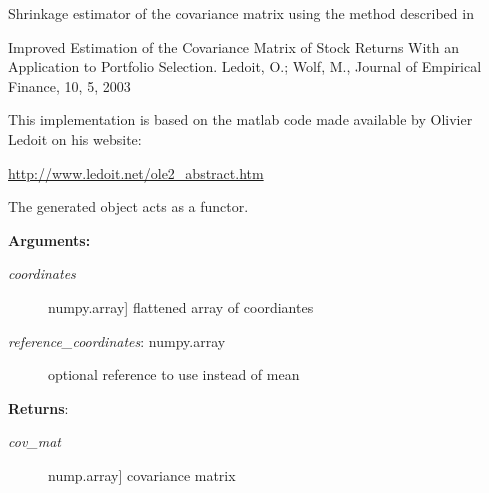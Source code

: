 \documentclass[letterpaper,10pt,english]{sphinxmanual}
\begin{document}
\begin{fulllineitems}
\label{index:encore.covariance.EstimatorShrinkage}
Shrinkage estimator of the covariance matrix using the method described in

Improved Estimation of the Covariance Matrix of Stock Returns With an Application 
to Portfolio Selection. Ledoit, O.; Wolf, M., Journal of Empirical Finance, 10, 5, 2003

This implementation is based on the matlab code made available by Olivier Ledoit on
his website:

\href{http://www.ledoit.net/ole2\_abstract.htm}{http://www.ledoit.net/ole2\_abstract.htm}

The generated object acts as a functor.

\begin{fulllineitems}
\label{index:encore.covariance.EstimatorShrinkage.calculate}
\textbf{Arguments:}
\begin{description}
\item[{\emph{coordinates}}] \leavevmode{[}numpy.array{]}
flattened array of coordiantes

\item[{\emph{reference\_coordinates}: numpy.array}] \leavevmode
optional reference to use instead of mean

\end{description}

\textbf{Returns}:
\begin{description}
\item[{\emph{cov\_mat}}] \leavevmode{[}nump.array{]}
covariance matrix

\end{description}

\end{fulllineitems}


\end{fulllineitems}

\end{document}

